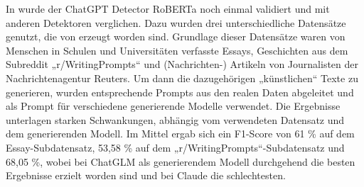 In \autocite{he2024mgtbenchbenchmarkingmachinegeneratedtext} wurde der ChatGPT Detector RoBERTa noch einmal validiert und mit anderen Detektoren verglichen. Dazu wurden drei unterschiedliche Datensätze genutzt, die von \autocite{verma2024ghostbusterdetectingtextghostwritten} erzeugt worden sind. Grundlage dieser Datensätze waren von Menschen in Schulen und Universitäten verfasste Essays, Geschichten aus dem Subreddit „r/WritingPrompts“ und (Nachrichten-) Artikeln von Journalisten der Nachrichtenagentur Reuters. Um dann die dazugehörigen „künstlichen“ Texte zu generieren, wurden entsprechende Prompts aus den realen Daten abgeleitet und als Prompt für verschiedene generierende Modelle verwendet. Die Ergebnisse unterlagen starken Schwankungen, abhängig vom verwendeten Datensatz und dem generierenden Modell. Im Mittel ergab sich ein F1-Score von 61 \% auf dem Essay-Subdatensatz, 53,58 \% auf dem „r/WritingPrompts“-Subdatensatz und 68,05 \%, wobei bei ChatGLM als generierendem Modell durchgehend die besten Ergebnisse erzielt worden sind und bei Claude die schlechtesten.

